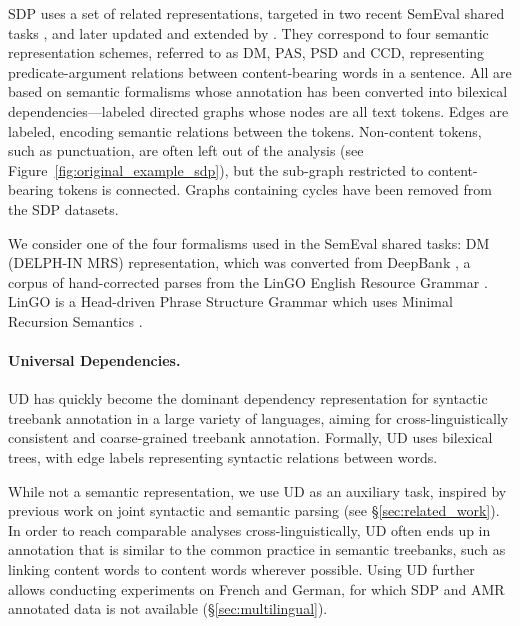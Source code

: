 \documentclass[11pt,a4paper]{article}
\begin{document}
SDP uses a set of related representations, targeted in two recent SemEval shared tasks 
\cite{oepen2014semeval,oepen2015semeval}, and later updated and extended by \citet{oepen2016towards}.
They correspond to four semantic representation schemes, referred to as
DM, PAS, PSD and CCD, representing
predicate-argument relations between content-bearing words in a sentence.
All are based on semantic formalisms whose annotation has been
converted into bilexical dependencies---labeled
directed graphs whose nodes are all text tokens.
Edges are labeled, encoding semantic relations between the tokens.
Non-content tokens, such as punctuation,
are often left out of the analysis (see Figure~\ref{fig:original_example_sdp}),
but the sub-graph restricted to content-bearing tokens is connected.
Graphs containing cycles have been removed from the SDP datasets.

We consider one of the four formalisms used
in the SemEval shared tasks: DM (DELPH-IN MRS) representation, which was converted from 
DeepBank \cite{flickinger2012deepbank}, a corpus of hand-corrected parses from the LinGO
English Resource Grammar \cite{copestake2000open}.
LinGO is a Head-driven Phrase
Structure Grammar \cite[HPSG; ][]{pollard1994head}
which uses Minimal Recursion Semantics \cite{copestake2005minimal}.


\paragraph{Universal Dependencies.}\label{sec:ud}
UD \cite{nivre2016universal,11234/1-2515} has quickly become
the dominant dependency representation for
syntactic treebank annotation in a large variety of languages,
aiming for cross-linguistically consistent and coarse-grained treebank
annotation. Formally, UD uses bilexical trees, with edge labels 
representing syntactic relations between words.

While not a semantic representation,
we use UD as an auxiliary task,
inspired by previous work on joint syntactic and semantic parsing
(see \S\ref{sec:related_work}).
In order to reach comparable analyses cross-linguistically,
UD often ends up in annotation that is similar to the common practice
in semantic treebanks, such as linking content words to content words wherever possible.
Using UD further allows conducting experiments on French and German, 
for which SDP and AMR annotated data is not available (\S\ref{sec:multilingual}).
\end{document}
